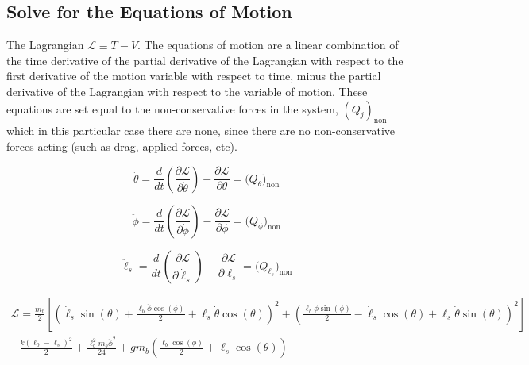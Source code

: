 \documentclass[12pt]{report}
\newcommand{\Lag}{\mathcal{L}} %
\begin{document}
\begin{flushleft}
\section{Solve for the Equations of Motion}
The Lagrangian $\Lag \equiv T - V$.
The equations of motion are a linear combination of the time derivative of the partial derivative of the Lagrangian with respect to the first derivative of the motion variable with
respect to time, minus the partial derivative of the Lagrangian with respect to the variable
 of motion. These equations are set equal to the non-conservative forces in the system,
 $(Q_j)_{\text{non}}$ which in this particular case there are none, since there are no
 non-conservative forces acting (such as drag, applied forces, etc).

\begin{minipage}[b]{.5\textwidth}
\begin{equation}
\ddot{\theta} = \frac{d}{dt}\left(\frac{\partial\Lag}{\partial\dot{\theta}}\right) -
\frac{\partial\Lag}{\partial\theta} = \big(Q_{\theta}\big)_{\text{non}}
\label{eq:lagtheta}
\end{equation}
\end{minipage}%
\begin{minipage}[b]{.5\textwidth}
\begin{equation}
\ddot{\phi} = \frac{d}{dt}\left(\frac{\partial\Lag}{\partial\dot{\phi}}\right) -
\frac{\partial\Lag}{\partial\phi} = \big(Q_{\phi}\big)_{\text{non}}
\label{eq:lagphi}
\end{equation}
\end{minipage}
\begin{equation}
\ddot{\ell}_s = \frac{d}{dt}\left(\frac{\partial\Lag}{\partial\dot{\ell}_s}\right) -
\frac{\partial\Lag}{\partial\ell_s} = \big(Q_{\ell_s}\big)_{\text{non}}
\label{eq:lagspring}
\end{equation}

\begin{equation}
\begin{split}
\Lag =
\frac{m_b}{2}\left[
\left(\dot{\ell}_s\sin(\theta) + \frac{\ell_b\dot{\phi}\cos(\phi)}{2} + \ell_s\dot{\theta}\cos(\theta)\right)^2 +
\left(\frac{\ell_b\dot{\phi}\sin(\phi)}{2} - \dot{\ell}_s\cos(\theta) + \ell_s\dot{\theta}\sin(\theta)\right)^2 \right] \\
- \frac{k(\ell_0 - \ell_s)^2}{2} + \frac{\ell_b^2m_b\dot{\phi}^2}{24} +
gm_b\left(\frac{\ell_b\cos(\phi)}{2} + \ell_s\cos(\theta)\right)
\label{eq:lag}
\end{split}
\end{equation}



\end{flushleft}
\end{document}
